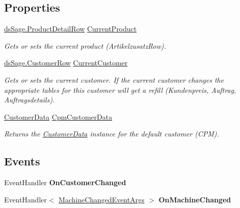 \subsection*{Properties}
\begin{DoxyCompactItemize}
\item 
\hyperlink{class_products_1_1_data_1_1ds_sage_1_1_product_detail_row}{ds\+Sage.\+Product\+Detail\+Row} \hyperlink{class_products_1_1_data_1_1_data_service_a528143e960156cad762a7c2e68231685}{Current\+Product}
\begin{DoxyCompactList}\small\item\em Gets or sets the current product (Artikelzusatz\+Row). \end{DoxyCompactList}\item 
\hyperlink{class_products_1_1_data_1_1ds_sage_1_1_customer_row}{ds\+Sage.\+Customer\+Row} \hyperlink{class_products_1_1_data_1_1_data_service_a764a7132feb14fdcf717ce22fa02f0aa}{Current\+Customer}
\begin{DoxyCompactList}\small\item\em Gets or sets the current customer. If the current customer changes the appropriate tables for this customer will get a refill (Kundenpreis, Auftrag, Auftragsdetails). \end{DoxyCompactList}\item 
\hyperlink{class_products_1_1_data_1_1_customer_data}{Customer\+Data} \hyperlink{class_products_1_1_data_1_1_data_service_aa1e20edc11f1f458d86b8188dced8994}{Cpm\+Customer\+Data}
\begin{DoxyCompactList}\small\item\em Returns the \hyperlink{class_products_1_1_data_1_1_customer_data}{Customer\+Data} instance for the default customer (C\+PM). \end{DoxyCompactList}\end{DoxyCompactItemize}
\subsection*{Events}
\begin{DoxyCompactItemize}
\item 
Event\+Handler {\bfseries On\+Customer\+Changed}\hypertarget{class_products_1_1_data_1_1_data_service_ab4b040d9a88fbdc44de7bafa2945fea1}{}\label{class_products_1_1_data_1_1_data_service_ab4b040d9a88fbdc44de7bafa2945fea1}

\item 
Event\+Handler$<$ \hyperlink{class_products_1_1_data_1_1_event_system_1_1_machine_changed_event_args}{Machine\+Changed\+Event\+Args} $>$ {\bfseries On\+Machine\+Changed}\hypertarget{class_products_1_1_data_1_1_data_service_a9eabb4183d45106bcbedb6900dc647d1}{}\label{class_products_1_1_data_1_1_data_service_a9eabb4183d45106bcbedb6900dc647d1}

\end{DoxyCompactItemize}


